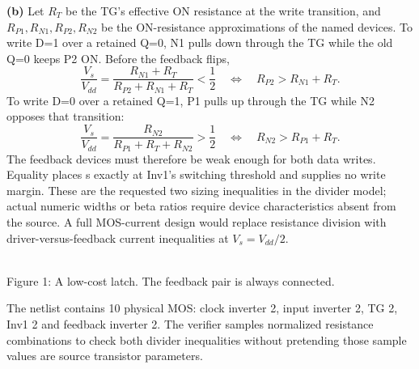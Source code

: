 \documentclass[10pt]{article}
\newcommand{\mos}[4]{\begin{scope}[shift={(#1,#2)}]
\draw(0,.24)--(0,-.24);\draw(0,.2)--(.25,.2)--(.25,.5);\draw(0,-.2)--(.25,-.2)--(.25,-.5);
\draw(-.16,.23)--(-.16,-.23);
\ifnum#4=1\draw(-.26,0)circle(.06);\draw(-.75,0)--(-.32,0);\else\draw(-.75,0)--(-.16,0);\fi
\node[anchor=east,font=\scriptsize]at(-.76,0){$#3$};\end{scope}}
\newcommand{\gnd}[2]{\draw(#1,#2)--(#1,{#2-.12});\draw({#1-.17},{#2-.12})--({#1+.17},{#2-.12});\draw({#1-.11},{#2-.2})--({#1+.11},{#2-.2});}
\newcommand{\rail}[3]{\draw(#1,#2)--(#1,{#2+.14});\node[above,font=\scriptsize]at(#1,{#2+.14}){$#3$};}
\begin{document}
\textbf{(b)} Let $R_T$ be the TG's effective ON resistance at the write transition, and $R_{P1},R_{N1},R_{P2},R_{N2}$ be the ON-resistance approximations of the named devices.
To write D=1 over a retained Q=0, N1 pulls down through the TG while the old Q=0 keeps P2 ON. Before the feedback flips,
\[\frac{V_s}{V_{dd}}=\frac{R_{N1}+R_T}{R_{P2}+R_{N1}+R_T}<\frac12
\quad\Longleftrightarrow\quad\boxed{R_{P2}>R_{N1}+R_T.}\]
To write D=0 over a retained Q=1, P1 pulls up through the TG while N2 opposes that transition:
\[\frac{V_s}{V_{dd}}=\frac{R_{N2}}{R_{P1}+R_T+R_{N2}}>\frac12
\quad\Longleftrightarrow\quad\boxed{R_{N2}>R_{P1}+R_T.}\]
The feedback devices must therefore be weak enough for both data writes. Equality places s exactly at Inv1's switching threshold and supplies no write margin. These are the requested two sizing inequalities in the divider model; actual numeric widths or beta ratios require device characteristics absent from the source. A full MOS-current design would replace resistance division with driver-versus-feedback current inequalities at $V_s=V_{dd}/2$.
\begin{center}\\Figure 1: A low-cost latch. The feedback pair is always connected.\end{center}
The netlist contains 10 physical MOS: clock inverter 2, input inverter 2, TG 2, Inv1 2 and feedback inverter 2. The verifier samples normalized resistance combinations to check both divider inequalities without pretending those sample values are source transistor parameters.
\end{document}
